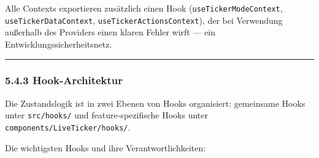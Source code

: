 Alle Contexts exportieren zusätzlich einen Hook
(\texttt{useTickerModeContext}, \texttt{useTickerDataContext},
\texttt{useTickerActionsContext}), der bei Verwendung außerhalb des
Providers einen klaren Fehler wirft --- ein Entwicklungssicherheitsnetz.

\begin{center}\rule{0.5\linewidth}{0.5pt}\end{center}

\subsubsection{5.4.3 Hook-Architektur}\label{hook-architektur}

Die Zustandslogik ist in zwei Ebenen von Hooks organisiert: gemeinsame
Hooks unter \texttt{src/hooks/} und feature-spezifische Hooks unter
\texttt{components/LiveTicker/hooks/}.

Die wichtigsten Hooks und ihre Verantwortlichkeiten:

